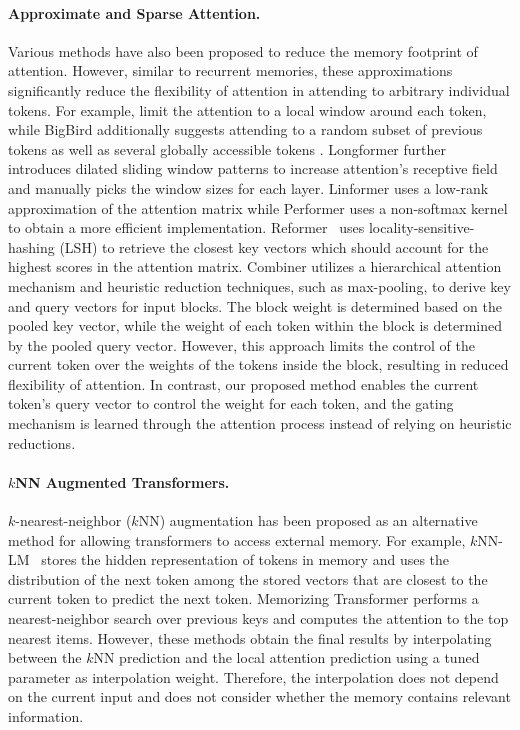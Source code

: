 \paragraph{Approximate and Sparse Attention.} Various methods have also been proposed to reduce the memory footprint of attention. However, similar to recurrent memories, these approximations significantly reduce the flexibility of attention in attending to arbitrary individual tokens. For example, \citet{child_generating_2019} limit the attention to a local window around each token, while BigBird additionally suggests attending to a random subset of previous tokens as well as several globally accessible tokens \cite{zaheer_big_2021}. Longformer \cite{beltagy_longformer_2020} further introduces dilated sliding window patterns to increase attention's receptive field and manually picks the window sizes for each layer. Linformer \cite{wang_linformer_2020} uses a low-rank approximation of the attention matrix while Performer \cite{choromanski_rethinking_2022} uses a non-softmax kernel to obtain a more efficient implementation. Reformer~\cite{kitaev2020reformer} uses locality-sensitive-hashing (LSH) to retrieve the closest key vectors which should account for the highest scores in the attention matrix. Combiner \cite{ren_combiner_2021} utilizes a hierarchical attention mechanism and heuristic reduction techniques, such as max-pooling, to derive key and query vectors for input blocks. The block weight is determined based on the pooled key vector, while the weight of each token within the block is determined by the pooled query vector. However, this approach limits the control of the current token over the weights of the tokens inside the block, resulting in reduced flexibility of attention. In contrast, our proposed method enables the current token's query vector to control the weight for each token, and the gating mechanism is learned through the attention process instead of relying on heuristic reductions.

\paragraph{$k$NN Augmented Transformers.} $k$-nearest-neighbor ($k$NN) augmentation has been proposed as an alternative method for allowing transformers to access external memory. For example, $k$NN-LM~\cite{khandelwal_generalization_2020} stores the hidden representation of tokens in memory and uses the distribution of the next token among the stored vectors that are closest to the current token to predict the next token. Memorizing Transformer \cite{wu_memorizing_2022} performs a nearest-neighbor search over previous keys and computes the attention to the top nearest items. However, these methods obtain the final results by interpolating between the $k$NN prediction and the local attention prediction using a tuned parameter as interpolation weight. Therefore, the interpolation does not depend on the current input and does not consider whether the memory contains relevant information. 

